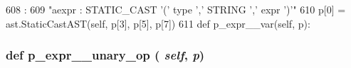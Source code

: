 \begin{DoxyCode}
608                                         :
609         "aexpr : STATIC_CAST '(' type ',' STRING ',' expr ')'"
610         p[0] = ast.StaticCastAST(self, p[3], p[5], p[7])
611 
    def p_expr__var(self, p):
\end{DoxyCode}
\hypertarget{classslicc_1_1parser_1_1SLICC_af3393422d64f7af992b9301c8428c90c}{
\subsubsection[{p\_\-expr\_\-\_\-unary\_\-op}]{\setlength{\rightskip}{0pt plus 5cm}def p\_\-expr\_\-\_\-unary\_\-op ( {\em self}, \/   {\em p})}}
\label{classslicc_1_1parser_1_1SLICC_af3393422d64f7af992b9301c8428c90c}
